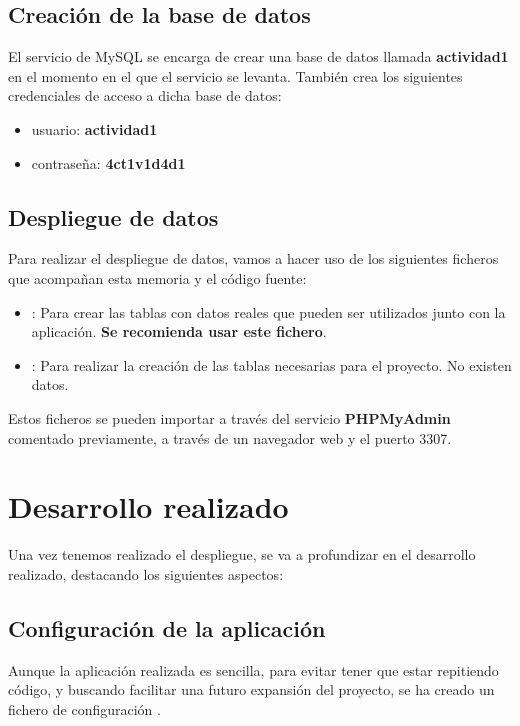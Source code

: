 \documentclass{\ClassPath/viu-tfm-template}
\begin{document}
\section{Creación de la base de datos}

El servicio de MySQL se encarga de crear una base de datos llamada \textbf{actividad1} en el momento en el que el servicio se levanta. También crea los siguientes credenciales de acceso a dicha base de datos:

\vspace{-1em}
\begin{itemize}
    \item usuario:  \textbf{actividad1}
    \item contraseña:  \textbf{4ct1v1d4d1}
\end{itemize}
\vspace{-1em}

\section{Despliegue de datos}
Para realizar el despliegue de datos, vamos a hacer uso de los siguientes ficheros que acompañan esta memoria y el código fuente:

\vspace{-1em}
\begin{itemize}
    \item {}: Para crear las tablas con datos reales que pueden ser utilizados junto con la aplicación. \textbf{Se recomienda usar este fichero}.
    \item {}: Para realizar la creación de las tablas necesarias para el proyecto. No existen datos.
\end{itemize}
\vspace{-1em}

Estos ficheros se pueden importar a través del servicio \textbf{PHPMyAdmin} comentado previamente, a través de un navegador web y el puerto 3307.


\chapter{Desarrollo realizado}

Una vez tenemos realizado el despliegue, se va a profundizar en el desarrollo realizado, destacando los siguientes aspectos:

\section{Configuración de la aplicación}
Aunque la aplicación realizada es sencilla, para evitar tener que estar repitiendo código, y buscando facilitar una futuro expansión del proyecto, se ha creado un fichero de configuración .
\end{document}
